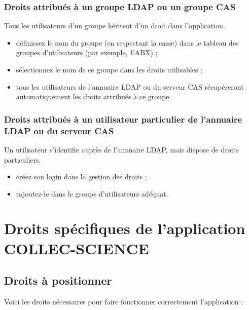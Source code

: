 \subsubsection{Droits attribués à un groupe LDAP ou un groupe CAS}

Tous les utilisateurs d'un groupe héritent d'un droit dans l'application.

\begin{itemize}
\item définissez le nom du groupe (en respectant la casse) dans le tableau des groupes d'utilisateurs (par exemple, EABX) ;
\item sélectionnez le nom de ce groupe dans les droits utilisables ;
\item tous les utilisateurs de l'annuaire LDAP ou du serveur CAS récupéreront automatiquement les droits attribués à ce groupe.
\end{itemize}

\subsubsection{Droits attribués à un utilisateur particulier de l'annuaire LDAP ou du serveur CAS}

Un utilisateur s'identifie auprès de l'annuaire LDAP, mais dispose de droits particuliers.

\begin{itemize}
\item créez son login dans la gestion des droits ;
\item rajoutez-le dans le groupe d'utilisateurs adéquat.
\end{itemize}


\section{Droits spécifiques de l'application COLLEC-SCIENCE}

\subsection{Droits à positionner}
Voici les droits nécessaires pour faire fonctionner correctement l'application :

